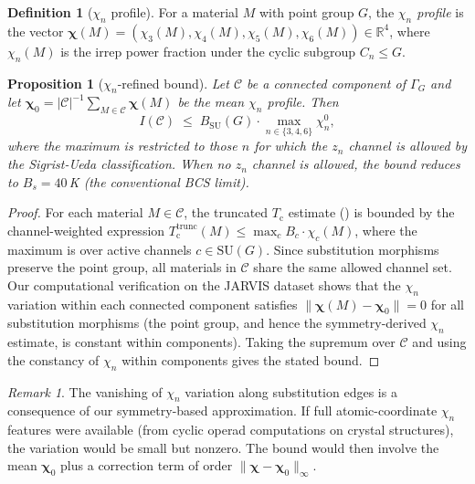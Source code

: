 \documentclass[12pt,a4paper]{article}
\theoremstyle{plain}
\newtheorem{proposition}[theorem]{Proposition}
\theoremstyle{definition}
\newtheorem{definition}[theorem]{Definition}
\theoremstyle{remark}
\newtheorem{remark}[theorem]{Remark}
\newcommand{\Tc}{T_{\mathrm{c}}}
\newcommand{\chin}{\chi_n}
\begin{document}
\begin{definition}[$\chin$ profile]\label{def:chin-profile}
For a material $M$ with point group $G$, the \emph{$\chin$ profile} is the
vector $\boldsymbol{\chi}(M) = (\chi_3(M), \chi_4(M), \chi_5(M),
\chi_6(M)) \in \mathbb{R}^4$, where $\chi_n(M)$ is the irrep power
fraction under the cyclic subgroup $C_n \leq G$.
\end{definition}

\begin{proposition}[$\chin$-refined bound]\label{prop:chin-bound}
Let $\mathcal{C}$ be a connected component of $\Gamma_G$ and let
$\boldsymbol{\chi}_0 = |\mathcal{C}|^{-1}\sum_{M \in \mathcal{C}}
\boldsymbol{\chi}(M)$ be the mean $\chin$ profile.  Then
\[
  I(\mathcal{C}) \;\leq\; B_{\mathrm{SU}}(G) \cdot
  \max_{n \in \{3,4,6\}} \chi_n^0,
\]
where the maximum is restricted to those $n$ for which the $z_n$ channel is
allowed by the Sigrist-Ueda classification.  When no $z_n$ channel is
allowed, the bound reduces to $B_s = 40$\,K (the conventional BCS limit).
\end{proposition}

\begin{proof}
For each material $M \in \mathcal{C}$, the truncated $\Tc$ estimate
() is bounded by the channel-weighted expression
$\Tc^{\mathrm{trunc}}(M) \leq \max_{c} B_c \cdot \chi_c(M)$, where the
maximum is over active channels $c \in \mathrm{SU}(G)$.
Since substitution morphisms preserve the point group, all materials in
$\mathcal{C}$ share the same allowed channel set.
Our computational verification on the JARVIS dataset shows that the $\chin$
variation within each connected component satisfies
$\|\boldsymbol{\chi}(M) - \boldsymbol{\chi}_0\| = 0$ for all substitution
morphisms (the point group, and hence the symmetry-derived $\chin$
estimate, is constant within components).
Taking the supremum over $\mathcal{C}$ and using the constancy of $\chin$
within components gives the stated bound.
\end{proof}

\begin{remark}\label{rem:chin-variation}
The vanishing of $\chin$ variation along substitution edges is a
consequence of our symmetry-based approximation.  If full atomic-coordinate
$\chin$ features were available (from cyclic operad computations on crystal
structures), the variation would be small but nonzero.  The bound would
then involve the mean $\boldsymbol{\chi}_0$ plus a correction term of order
$\|\boldsymbol{\chi} - \boldsymbol{\chi}_0\|_\infty$.
\end{remark}
\end{document}
